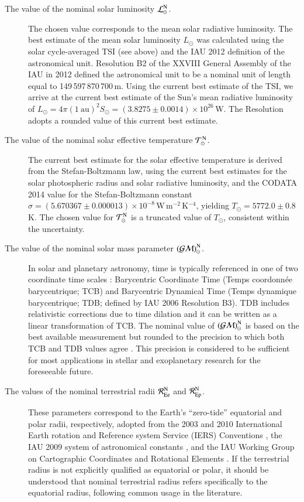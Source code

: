 \documentclass[preprint]{aastex}
\newcommand{\Lnom}{\hbox{$\mathcal{L}^{\mathrm N}_\odot$}}
\newcommand{\Tnom}{\hbox{$\mathcal{T}^{\mathrm N}_\odot$}}
\newcommand{\GMnom}{\hbox{$\mathcal{(GM)}^{\mathrm N}_\odot$}}
\newcommand{\REenom}{\hbox{$\mathcal{R}^{\mathrm N}_\mathrm{Ee}$}}
\newcommand{\REpnom}{\hbox{$\mathcal{R}^{\mathrm N}_\mathrm{Ep}$}}
\begin{document}
\begin{description}
\item[The value of the nominal solar luminosity $\Lnom$.] The chosen value corresponds to the mean solar radiative luminosity. The best estimate of the mean solar luminosity $L_\odot$ was calculated using the solar cycle-averaged TSI (see above) and the IAU 2012 definition of the astronomical unit. Resolution B2 of the XXVIII General Assembly of the IAU in 2012 defined the astronomical unit to be a nominal unit of length equal to 149\,597\,870\,700\,m. Using the current best estimate of the TSI, we arrive at the current best estimate of the Sun's mean radiative luminosity of $L_\odot = 4\pi (1~\mathrm{au})^2 S_\odot = (3.8275 \pm 0.0014) \times 10^{26}$\,W. The Resolution adopts a rounded value of this current best estimate.

\item[The value of the nominal solar effective temperature $\Tnom$.] The current best estimate for the solar effective temperature is derived from the Stefan-Boltzmann law, using the current best estimates for the solar photospheric radius and solar radiative luminosity, and the CODATA 2014 value for the Stefan-Boltzmann constant $\sigma = (5.670367 \pm 0.000013) \times 10^{-8}$\,W\,m${}^{-2}$\,K${}^{-4}$, yielding $T_\odot = 5772.0 \pm 0.8$\,K. The chosen value for $\Tnom$ is a truncated value of $T_\odot$, consistent within the uncertainty.

\item[The value of the nominal solar mass parameter $\GMnom$.] In solar and planetary astronomy, time is typically referenced in one of two coordinate time scales \citep{klioner2006}: Barycentric Coordinate Time (Temps coordonn\' ee barycentrique; TCB) and Barycentric Dynamical Time (Temps dynamique barycentrique; TDB; defined by IAU 2006 Resolution B3). TDB includes relativistic corrections due to time dilation and it can be written as a linear transformation of TCB. The nominal value of $\GMnom$ is based on the best available measurement \citep{petit2010} but rounded to the precision to which both TCB and TDB values agree \citep{luzum2011}. This precision is considered to be sufficient for most applications in stellar and exoplanetary research for the foreseeable future.

\item[The values of the nominal terrestrial radii $\REenom$ and $\REpnom$.] These parameters correspond to the Earth's ``zero-tide'' equatorial and polar radii, respectively, adopted from the 2003 and 2010 International Earth rotation and Reference system Service (IERS) Conventions \citep{mccarthy2004, petit2010}, the IAU 2009 system of astronomical constants \citep{luzum2011}, and the IAU Working Group on Cartographic Coordinates and Rotational Elements \citep{archinal2011}. If the terrestrial radius is not explicitly qualified as equatorial or polar, it should be understood that nominal terrestrial radius refers specifically to the equatorial radius, following common usage in the literature.


\end{description}
\end{document}
